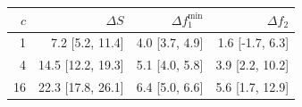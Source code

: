\begin{tabular}{rrrr}
\toprule
$c$ & $\Delta S$ & $\Delta f_1^{\min}$ & $\Delta f_2$ \\
\midrule
1 & 7.2 [5.2, 11.4] & 4.0 [3.7, 4.9] & 1.6 [-1.7, 6.3] \\
4 & 14.5 [12.2, 19.3] & 5.1 [4.0, 5.8] & 3.9 [2.2, 10.2] \\
16 & 22.3 [17.8, 26.1] & 6.4 [5.0, 6.6] & 5.6 [1.7, 12.9] \\
\bottomrule
\end{tabular}
